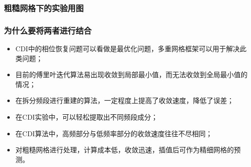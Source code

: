 \documentclass[10pt,aspectratio=169]{beamer} %
\begin{document}
\begin{frame}
    \frametitle{粗糙网格下的实验用图}
    \begin{figure}
    \end{figure}
\end{frame}

\begin{frame}
    \frametitle{为什么要将两者进行结合}
    \begin{itemize}
        \item CDI中的相位恢复问题可以看做是最优化问题，多重网格框架可以用于解决此类问题；
        \item 目前的傅里叶迭代算法易出现收敛到局部最小值，而无法收敛到全局最小值的情况；
        \item 在拆分频段进行重建的算法，一定程度上提高了收敛速度，降低了误差；
        \item 在CDI实验中，可以轻松提取出不同频段成分；
        \item 在CDI算法中，高频部分与低频率部分的收敛速度往往不尽相同；
        \item 对粗糙网格进行处理，计算成本低，收敛迅速，插值后可作为精细网格的预测。
    \end{itemize}
\end{frame}
\end{document}
